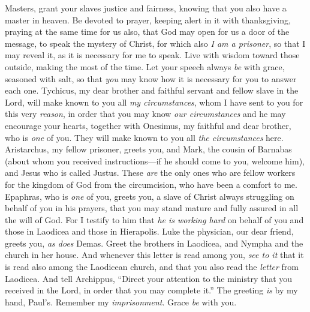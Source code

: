\begin{biblechapter} %
\verse Masters, grant your slaves justice and fairness, knowing that you also have a master in heaven.
 Be devoted to prayer, keeping alert in it with thanksgiving,
\verse praying at the same time for us also, that God may open for us a door of the message, to speak the mystery of Christ, for which also \textit{I am a prisoner},
\verse so that I may reveal it, as it is necessary for me to speak.
\verse Live with wisdom toward those outside, making the most of the time.
\verse Let your speech always \textit{be} with grace, seasoned with salt, so that \textit{you} may know how it is necessary for you to answer each one.
 Tychicus, my dear brother and faithful servant and fellow slave in the Lord, will make known to you all \textit{my circumstances},
\verse whom I have sent to you for this very \textit{reason}, in order that you may know \textit{our circumstances} and he may encourage your hearts,
\verse together with Onesimus, my faithful and dear brother, who is \textit{one} of you. They will make known to you all \textit{the circumstances} here.
\verse Aristarchus, my fellow prisoner, greets you, and Mark, the cousin of Barnabas (about whom you received instructions—if he should come to you, welcome him),
\verse and Jesus who is called Justus. These \textit{are} the only ones who are fellow workers for the kingdom of God from the circumcision, who have been a comfort to me.
\verse Epaphras, who is \textit{one} of you, greets you, a slave of Christ always struggling on behalf of you in his prayers, that you may stand mature and fully assured in all the will of God.
\verse For I testify to him that \textit{he is working hard} on behalf of you and those in Laodicea and those in Hierapolis.
\verse Luke the physician, our dear friend, greets you, \textit{as does} Demas.
\verse Greet the brothers in Laodicea, and Nympha and the church in her house.
\verse And whenever this letter is read among you, \textit{see to it} that it is read also among the Laodicean church, and that you also read the \textit{letter} from Laodicea.
\verse And tell Archippus, “Direct your attention to the ministry that you received in the Lord, in order that you may complete it.”
 The greeting \textit{is} by my hand, Paul’s. Remember my \textit{imprisonment}. Grace \textit{be} with you.
\end{biblechapter}

